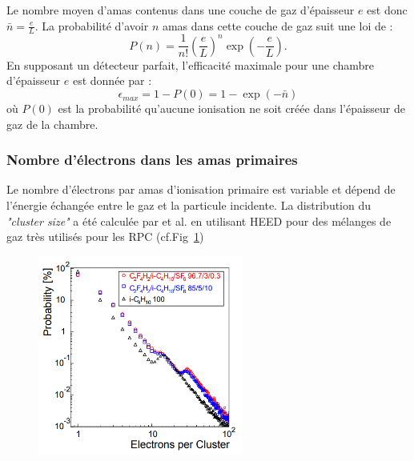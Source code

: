 Le nombre moyen d'amas contenus dans une couche de gaz d'épaisseur $e$ est donc $\bar{n}=\frac{e}{L}$. La probabilité d'avoir $n$ amas dans cette couche de gaz suit une loi de  :
\begin{equation}
P(n)=\frac{1}{n!}\left(\frac{e}{L}\right)^{n}\exp\left(-\frac{e}{L}\right).
\end{equation}
En supposant un détecteur parfait, l'efficacité maximale pour une chambre d'épaisseur $e$ est donnée par :
\begin{equation}
\epsilon_{max}=1-P(0)=1-\exp\left(-\bar{n}\right)
\end{equation}
où $P(0)$ est la probabilité qu'aucune ionisation ne soit créée dans l'épaisseur de gaz de la chambre.

\subsubsection{Nombre d'électrons dans les amas primaires}
Le nombre d'électrons par amas d'ionisation primaire est variable et dépend de l'énergie échangée entre le gaz et la particule incidente. La distribution du \textit{"cluster size"} a été calculée par  et al. \cite{Riegler:570462} en utilisant HEED pour des mélanges de gaz très utilisés pour les RPC (cf.Fig~\ref{cluster})
\begin{figure}[ht!]
	\centering
	\includegraphics[width=0.60\textwidth]{RPC/cluster.png}
	\label{cluster}
\end{figure}

